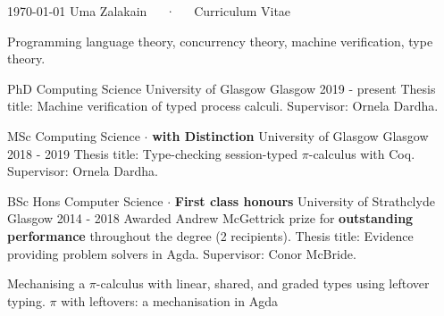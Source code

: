 \documentclass[11pt, a4paper]{awesome-cv}
\begin{document}
\makecvheader

\makecvfooter
  {\today}
  {Uma Zalakain~~~·~~~Curriculum Vitae}
  {\thepage}


\begin{centering}
\begin{cvparagraph}
Programming language theory, concurrency theory, machine verification, type theory.
\end{cvparagraph}
\end{centering}


\begin{cventries}
    \cventry
      {PhD Computing Science} %
      {University of Glasgow} %
      {Glasgow} %
      {2019 - present} %
      {
          Thesis title: Machine verification of typed process calculi.\newline
          Supervisor: Ornela Dardha.\newline
      }

    \cventry
      {MSc Computing Science $\cdot$ \textbf{with Distinction}} %
      {University of Glasgow} %
      {Glasgow} %
      {2018 - 2019} %
      {
          Thesis title: Type-checking session-typed $\pi$-calculus with Coq.\newline
          Supervisor: Ornela Dardha.\newline
      }

    \cventry
      {BSc Hons Computer Science $\cdot$ \textbf{First class honours}} %
      {University of Strathclyde} %
      {Glasgow} %
      {2014 - 2018} %
      {
          Awarded Andrew McGettrick prize for \textbf{outstanding performance}
          throughout the degree (2 recipients).\newline
          Thesis title: Evidence providing problem solvers in Agda.\newline
          Supervisor: Conor McBride.\newline
      }
\end{cventries}


\begin{cventries}
  \cventry
  {Mechanising a $\pi$-calculus with linear, shared, and graded types using leftover typing.}
  {$\pi$ with leftovers: a mechanisation in Agda}
  {\href{https://arxiv.org/abs/2005.05902}{}}
  {\href{https://github.com/umazalakain/typing-with-leftovers}{}}
  {}
\end{cventries}
\end{document}
